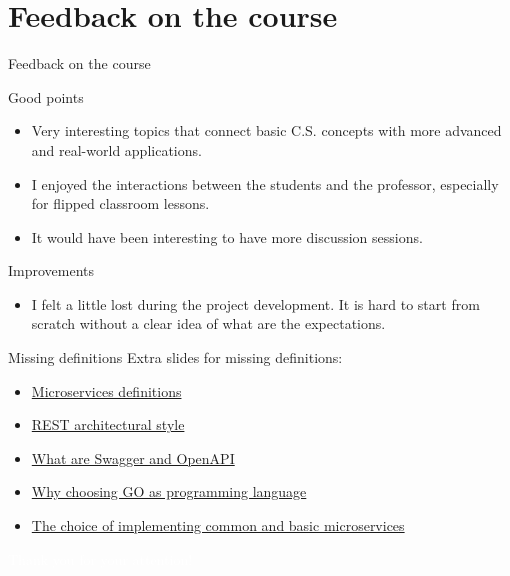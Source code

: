 \documentclass{beamer}
\begin{document}
\section{Feedback on the course}
\begin{frame}{Feedback on the course}
	\begin{block}{Good points}
		\begin{itemize}
			\item Very interesting topics that connect basic C.S. concepts with more advanced and real-world applications.
			\item I enjoyed the interactions between the students and the professor, especially for flipped classroom lessons.
			\item It would have been interesting to have more discussion sessions.
		\end{itemize}
	\end{block}
	\begin{block}{Improvements}
		\begin{itemize}
			\item I felt a little lost during the project development. It is hard to start from scratch without a clear idea of what are the expectations.
		\end{itemize}
	\end{block}
\end{frame}

\begin{frame}{Missing definitions}
	\label{index_1}
	Extra slides for missing definitions:
		\begin{itemize}
			\item \hyperlink{microservices_definitions}{Microservices definitions}
			\item \hyperlink{rest}{REST architectural style}
			\item \hyperlink{swagger_openapi}{What are Swagger and OpenAPI}
			\item \hyperlink{golang}{Why choosing GO as programming language}
			\item \hyperlink{common_ms}{The choice of implementing common and basic microservices}
		\end{itemize}
\end{frame}

\begin{frame}{}
	\begin{center}
		\Huge{\textcolor{white}{Thank you for your attention!}}
	\end{center}
\end{frame}
\end{document}
